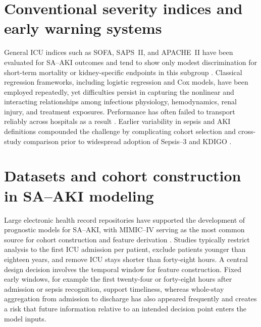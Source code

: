 \section{Conventional severity indices and early warning systems}
General ICU indices such as SOFA, SAPS~II, and APACHE~II have been evaluated for SA--AKI outcomes and tend to show only modest discrimination for short-term mortality or kidney-specific endpoints in this subgroup \citep{Luo_2022,Li_2023_SciRep,Qu_2024}. Classical regression frameworks, including logistic regression and Cox models, have been employed repeatedly, yet difficulties persist in capturing the nonlinear and interacting relationships among infectious physiology, hemodynamics, renal injury, and treatment exposures. Performance has often failed to transport reliably across hospitals as a result \citep{Kang_Yoon_2023,Luo_2022,Li_2023_SciRep}. Earlier variability in sepsis and AKI definitions compounded the challenge by complicating cohort selection and cross-study comparison prior to widespread adoption of Sepsis--3 and KDIGO \citep{Singer_2016,KDIGO_2012}.

\section{Datasets and cohort construction in SA--AKI modeling}
Large electronic health record repositories have supported the development of prognostic models for SA--AKI, with MIMIC--IV serving as the most common source for cohort construction and feature derivation \citep{Johnson_2023_MIMIC}. Studies typically restrict analysis to the first ICU admission per patient, exclude patients younger than eighteen years, and remove ICU stays shorter than forty-eight hours. A central design decision involves the temporal window for feature construction. Fixed early windows, for example the first twenty-four or forty-eight hours after admission or sepsis recognition, support timeliness, whereas whole-stay aggregation from admission to discharge has also appeared frequently and creates a risk that future information relative to an intended decision point enters the model inputs.

